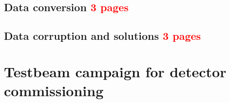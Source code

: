 		\subsection{Data conversion \textcolor{red}{ 3 pages}}
		\subsection{Data corruption and solutions  \textcolor{red}{ 3 pages}}
		
	
	
	
	\clearpage
	\section{Testbeam campaign for detector commissioning}
		
		
		
		
		
		
		
		
		
		
		
		
		
		
		
		
		
		
		
		
		
		
		
		
		
		
		
		
		
		
		
		
		
		
		
		
		
		
		
		
		
		
		
		
		
		
		
		
		
		
		
		
		
		
		
		
		
		
		
		
